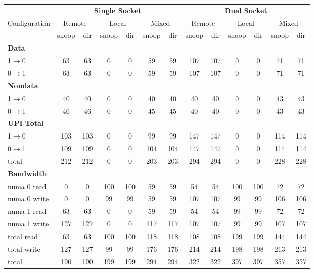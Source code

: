 \begin{table}[t] \centering \small \setlength{\tabcolsep}{5pt}
\renewcommand{\arraystretch}{1.2}

\begin{tabular}{|l|cc|cc|cc||cc|cc|cc|}
\hline

& \multicolumn{6}{c||}{\textbf{Single Socket}}
& \multicolumn{6}{c|}{\textbf{Dual Socket}} \\
\cline{2-13}

Configuration &
\multicolumn{2}{c|}{Remote} &
\multicolumn{2}{c|}{Local} &
\multicolumn{2}{c||}{Mixed} &
\multicolumn{2}{c|}{Remote} &
\multicolumn{2}{c|}{Local} &
\multicolumn{2}{c|}{Mixed} \\
\hline

& snoop & dir
& snoop & dir
& snoop & dir
& snoop & dir
& snoop & dir
& snoop & dir \\
\hline\hline

\multicolumn{13}{|l|}{\textbf{Data}} \\
\hline
1$\rightarrow$0 & 63 & 63 & 0 & 0 & 59 & 59 & 107 & 107 & 0 & 0 & 71 & 71 \\
\hline
0$\rightarrow$1 & 63 & 63 & 0 & 0 & 59 & 59 & 107 & 107 & 0 & 0 & 71 & 71 \\
\hline

\multicolumn{13}{|l|}{\textbf{Nondata}} \\
\hline
1$\rightarrow$0 & 40 & 40 & 0 & 0 & 40 & 40 & 40 & 40 & 0 & 0 & 43 & 43 \\
\hline
0$\rightarrow$1 & 46 & 46 & 0 & 0 & 45 & 45 & 40 & 40 & 0 & 0 & 43 & 43 \\
\hline

\multicolumn{13}{|l|}{\textbf{UPI Total}} \\
\hline
1$\rightarrow$0 & 103 & 103 & 0 & 0 & 99 & 99 & 147 & 147 & 0 & 0 & 114 & 114 \\
\hline
0$\rightarrow$1 & 109 & 109 & 0 & 0 & 104 & 104 & 147 & 147 & 0 & 0 & 114 & 114 \\
\hline
total           & 212 & 212 & 0 & 0 & 203 & 203 & 294 & 294 & 0 & 0 & 228 & 228 \\
\hline

\multicolumn{13}{|l|}{\textbf{Bandwidth}} \\
\hline
numa 0 read     & 0 & 0 & 100 & 100 & 59 & 59 & 54 & 54 & 100 & 100 & 72 & 72 \\
\hline
numa 0 write    & 0 & 0 & 99 & 99 & 59 & 59 & 107 & 107 & 99 & 99 & 106 & 106 \\
\hline
numa 1 read     & 63 & 63 & 0 & 0 & 59 & 59 & 54 & 54 & 99 & 99 & 72 & 72 \\
\hline
numa 1 write    & 127 & 127 & 0 & 0 & 117 & 117 & 107 & 107 & 99 & 99 & 107 & 107 \\
\hline
total read      & 63 & 63 & 100 & 100 & 118 & 118 & 108 & 108 & 199 & 199 & 144 & 144 \\
\hline
total write     & 127 & 127 & 99 & 99 & 176 & 176 & 214 & 214 & 198 & 198 & 213 & 213 \\
\hline
total           & 190 & 190 & 199 & 199 & 294 & 294 & 322 & 322 & 397 & 397 & 357 & 357 \\
\hline


\end{tabular}
\end{table}
